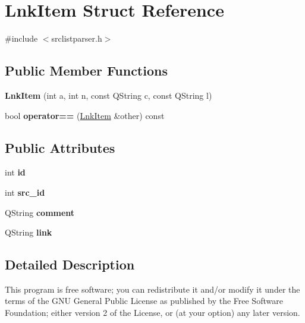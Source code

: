 \hypertarget{structLnkItem}{
\section{LnkItem Struct Reference}
\label{structLnkItem}
}


{\ttfamily \#include $<$srclistparser.h$>$}

\subsection*{Public Member Functions}
\begin{DoxyCompactItemize}
\item 
\hypertarget{structLnkItem_a062c5a1a9df0d9bf0e4b899698ba0d56}{
{\bfseries LnkItem} (int a, int n, const QString c, const QString l)}
\label{structLnkItem_a062c5a1a9df0d9bf0e4b899698ba0d56}

\item 
\hypertarget{structLnkItem_a9128caee7a1c451a5a19140e05c75808}{
bool {\bfseries operator==} (\hyperlink{structLnkItem}{LnkItem} \&other) const }
\label{structLnkItem_a9128caee7a1c451a5a19140e05c75808}

\end{DoxyCompactItemize}
\subsection*{Public Attributes}
\begin{DoxyCompactItemize}
\item 
\hypertarget{structLnkItem_adf62f7b0e258f9ba4777556899f3834a}{
int {\bfseries id}}
\label{structLnkItem_adf62f7b0e258f9ba4777556899f3834a}

\item 
\hypertarget{structLnkItem_a33b1d48939c492ccf77b22b87c0ac3fd}{
int {\bfseries src\_\-id}}
\label{structLnkItem_a33b1d48939c492ccf77b22b87c0ac3fd}

\item 
\hypertarget{structLnkItem_a0a869703774bf29a9415585f09db83a9}{
QString {\bfseries comment}}
\label{structLnkItem_a0a869703774bf29a9415585f09db83a9}

\item 
\hypertarget{structLnkItem_ad55610d3d317ddbc08c7507de8ed7fe1}{
QString {\bfseries link}}
\label{structLnkItem_ad55610d3d317ddbc08c7507de8ed7fe1}

\end{DoxyCompactItemize}


\subsection{Detailed Description}
This program is free software; you can redistribute it and/or modify it under the terms of the GNU General Public License as published by the Free Software Foundation; either version 2 of the License, or (at your option) any later version.


